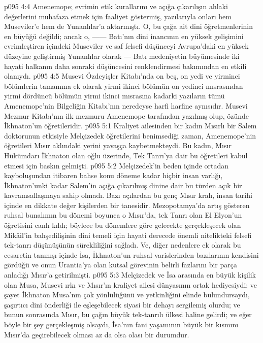 \vs p095 4:4 Amenemope; evrimin etik kurallarını ve açığa çıkarılışın ahlaki değerlerini muhafaza etmek için faaliyet göstermiş, yazılarıyla onları hem Museviler’e hem de Yunanlılar’a aktarmıştı. O, bu çağa ait dini öğretmenlerinin en büyüğü değildi; ancak o, ------ Batı’nın dini inancının en yüksek gelişimini evrimleştiren içindeki Museviler ve saf felsefi düşünceyi Avrupa’daki en yüksek düzeyine geliştirmiş Yunanlılar olarak --- Batı medeniyetin büyümesinde iki hayati halkanın daha sonraki düşüncesini renklendirmesi bakımından en etkili olanıydı.
\vs p095 4:5 Musevi Özdeyişler Kitabı’nda on beş, on yedi ve yirminci bölümlerin tamamına ek olarak yirmi ikinci bölümün on yedinci mısrasından yirmi dördüncü bölümün yirmi ikinci mısrasına kadarki yazıların tümü Amenemope’nin Bilgeliğin Kitabı’nın neredeyse harfi harfine aynısıdır. Musevi Mezmur Kitabı’nın ilk mezmuru Amenemope tarafından yazılmış olup, özünde İkhnaton’un öğretileridir.
\vs p095 5:1 Kraliyet ailesinden bir kadın Mısırlı bir Salem doktorunun etkisiyle Melçizedek öğretilerini benimsediği zaman, Amenemope’nin öğretileri Mısır aklındaki yerini yavaşça kaybetmekteydi. Bu kadın, Mısır Hükümdarı İkhnaton olan oğlu üzerinde, Tek Tanrı’ya dair bu öğretileri kabul etmesi için baskın gelmişti.
\vs p095 5:2 Melçizedek’in beden içinde ortadan kayboluşundan itibaren bahse konu döneme kadar hiçbir insan varlığı, İkhnaton’unki kadar Salem’in açığa çıkarılmış dinine dair bu türden açık bir kavramsallaşmaya sahip olmadı. Bazı açılardan bu genç Mısır kralı, insan tarihi içinde en dikkate değer kişilerden bir tanesidir. Mezopotamya’da artış gösteren ruhsal bunalımın bu dönemi boyunca o Mısır’da, tek Tanrı olan El Elyon’un öğretisini canlı kıldı; böylece bu dönemlere göre gelecekte gerçekleşecek olan Mikâil’in bahşedilişinin dini temeli için hayati derecede önemli nitelikteki felsefi tek\hyp{}tanrı düşünüşünün sürekliliğini sağladı. Ve, diğer nedenlere ek olarak bu cesaretin tanınışı içinde İsa, İkhnaton’un ruhsal varislerinden bazılarının kendisini gördüğü ve onun Urantia’ya olan kutsal görevinin belirli fazlarını bir parça anladığı Mısır’a getirilmişti.
\vs p095 5:3 Melçizedek ve İsa arasında en büyük kişilik olan Musa, Musevi ırkı ve Mısır’ın kraliyet ailesi dünyasının ortak hediyesiydi; ve şayet İkhnaton Musa’nın çok yönlülüğünü ve yetkinliğini elinde bulundursaydı, şaşırtıcı dini önderliği ile eşleşebilecek siyasi bir dehayı sergilemiş olurdu; ve bunun sonrasında Mısır, bu çağın büyük tek\hyp{}tanrılı ülkesi haline gelirdi; ve eğer böyle bir şey gerçekleşmiş olsaydı, İsa’nın fani yaşamının büyük bir kısmını Mısır’da geçirebilecek olması az da olsa olası bir durumdur.

